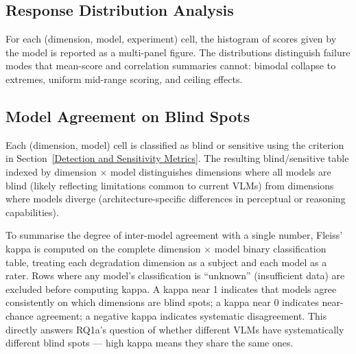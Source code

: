 \subsection{Response Distribution Analysis} \label{Response Distribution Analysis}

For each (dimension, model, experiment) cell, the histogram of scores given by the model is reported as a multi-panel figure. The distributions distinguish failure modes that mean-score and correlation summaries cannot: bimodal collapse to extremes, uniform mid-range scoring, and ceiling effects.

\subsection{Model Agreement on Blind Spots} \label{Model Agreement on Blind Spots}

Each (dimension, model) cell is classified as blind or sensitive using the criterion in Section~\ref{Detection and Sensitivity Metrics}. The resulting blind/sensitive table indexed by dimension $\times$ model distinguishes dimensions where all models are blind (likely reflecting limitations common to current VLMs) from dimensions where models diverge (architecture-specific differences in perceptual or reasoning capabilities).

To summarise the degree of inter-model agreement with a single number, Fleiss' kappa is computed on the complete dimension $\times$ model binary classification table, treating each degradation dimension as a subject and each model as a rater. Rows where any model's classification is ``unknown'' (insufficient data) are excluded before computing kappa. A kappa near 1 indicates that models agree consistently on which dimensions are blind spots; a kappa near 0 indicates near-chance agreement; a negative kappa indicates systematic disagreement. This directly answers RQ1a's question of whether different VLMs have systematically different blind spots --- high kappa means they share the same ones.

